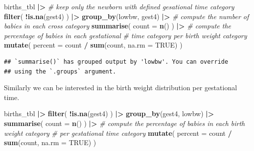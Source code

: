 \documentclass[
]{book}
\newenvironment{Shaded}{\begin{snugshade}}{\end{snugshade}}
\newcommand{\AttributeTok}[1]{\textcolor[rgb]{0.13,0.29,0.53}{#1}}
\newcommand{\CommentTok}[1]{\textcolor[rgb]{0.56,0.35,0.01}{\textit{#1}}}
\newcommand{\ConstantTok}[1]{\textcolor[rgb]{0.56,0.35,0.01}{#1}}
\newcommand{\FunctionTok}[1]{\textcolor[rgb]{0.13,0.29,0.53}{\textbf{#1}}}
\newcommand{\NormalTok}[1]{#1}
\newcommand{\SpecialCharTok}[1]{\textcolor[rgb]{0.81,0.36,0.00}{\textbf{#1}}}
\begin{document}
\begin{Shaded}
\begin{Highlighting}[]
\NormalTok{births\_tbl }\SpecialCharTok{|\textgreater{}}
  \CommentTok{\# keep only the newborn with defined gesational time category}
  \FunctionTok{filter}\NormalTok{(}
    \SpecialCharTok{!}\FunctionTok{is.na}\NormalTok{(gest4)}
\NormalTok{  ) }\SpecialCharTok{|\textgreater{}}
  \FunctionTok{group\_by}\NormalTok{(lowbw, gest4) }\SpecialCharTok{|\textgreater{}}
  \CommentTok{\# compute the number of babies in each cross category}
  \FunctionTok{summarise}\NormalTok{(}
    \AttributeTok{count =} \FunctionTok{n}\NormalTok{()}
\NormalTok{  ) }\SpecialCharTok{|\textgreater{}}
  \CommentTok{\# compute the percentage of babies in each gestational }
  \CommentTok{\# time category per birth weight category}
  \FunctionTok{mutate}\NormalTok{(}
    \AttributeTok{percent =}\NormalTok{ count }\SpecialCharTok{/} \FunctionTok{sum}\NormalTok{(count, }\AttributeTok{na.rm =} \ConstantTok{TRUE}\NormalTok{)}
\NormalTok{  )}
\end{Highlighting}
\end{Shaded}

\begin{verbatim}
## `summarise()` has grouped output by 'lowbw'. You can override
## using the `.groups` argument.
\end{verbatim}

Similarly we can be interested in the birth weight distribution per gestational time.

\begin{Shaded}
\begin{Highlighting}[]
\NormalTok{births\_tbl }\SpecialCharTok{|\textgreater{}}
  \FunctionTok{filter}\NormalTok{(}
    \SpecialCharTok{!}\FunctionTok{is.na}\NormalTok{(gest4)}
\NormalTok{  ) }\SpecialCharTok{|\textgreater{}}
  \FunctionTok{group\_by}\NormalTok{(gest4, lowbw) }\SpecialCharTok{|\textgreater{}}
  \FunctionTok{summarise}\NormalTok{(}
    \AttributeTok{count =} \FunctionTok{n}\NormalTok{()}
\NormalTok{  ) }\SpecialCharTok{|\textgreater{}}
  \CommentTok{\# compute the percentage of babies in each birth weight category}
  \CommentTok{\# per gestational time category}
  \FunctionTok{mutate}\NormalTok{(}
    \AttributeTok{percent =}\NormalTok{ count }\SpecialCharTok{/} \FunctionTok{sum}\NormalTok{(count, }\AttributeTok{na.rm =} \ConstantTok{TRUE}\NormalTok{)}
\NormalTok{  )}
\end{Highlighting}
\end{Shaded}
\end{document}
